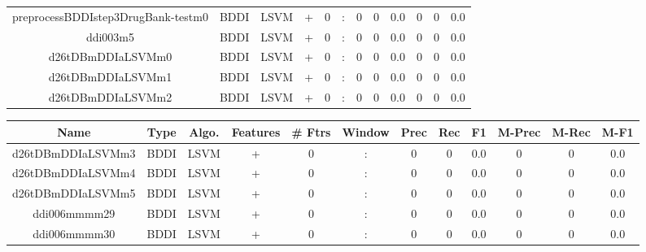 \documentclass[a4paper]{article}
\begin{document}
\begin{landscape}
\begin{center}
\begin{tabular}{ |c|c|c|c|c|c|c|c|c|c|c|c|}
 
 	
 	\small{ preprocessBDDIstep3DrugBank-testm0 } & BDDI & LSVM & +  &  0 &  :  &  0 & 0 & 0.0  &  0 & 0 & 0.0 \\
 	

 
 	
 	\small{ ddi003m5 } & BDDI & LSVM & +  &  0 &  :  &  0 & 0 & 0.0  &  0 & 0 & 0.0 \\
 	

 
 	
 	\small{ d26tDBmDDIaLSVMm0 } & BDDI & LSVM & +  &  0 &  :  &  0 & 0 & 0.0  &  0 & 0 & 0.0 \\
 	

 
 	
 	\small{ d26tDBmDDIaLSVMm1 } & BDDI & LSVM & +  &  0 &  :  &  0 & 0 & 0.0  &  0 & 0 & 0.0 \\
 	

 
 	
 	\small{ d26tDBmDDIaLSVMm2 } & BDDI & LSVM & +  &  0 &  :  &  0 & 0 & 0.0  &  0 & 0 & 0.0 \\
 	
 \hline
\end{tabular}
\end{center}




\begin{center}
\begin{tabular}{ |c|c|c|c|c|c|c|c|c|c|c|c|} 
 \hline
 	Name & Type & Algo. & Features & \# Ftrs & Window & Prec & Rec & F1 & M-Prec & M-Rec & M-F1\\
 \hline

 	

 
 	
 	\small{ d26tDBmDDIaLSVMm3 } & BDDI & LSVM & +  &  0 &  :  &  0 & 0 & 0.0  &  0 & 0 & 0.0 \\
 	

 
 	
 	\small{ d26tDBmDDIaLSVMm4 } & BDDI & LSVM & +  &  0 &  :  &  0 & 0 & 0.0  &  0 & 0 & 0.0 \\
 	

 
 	
 	\small{ d26tDBmDDIaLSVMm5 } & BDDI & LSVM & +  &  0 &  :  &  0 & 0 & 0.0  &  0 & 0 & 0.0 \\
 	

 
 	
 	\small{ ddi006mmmm29 } & BDDI & LSVM & +  &  0 &  :  &  0 & 0 & 0.0  &  0 & 0 & 0.0 \\
 	

 
 	
 	\small{ ddi006mmmm30 } & BDDI & LSVM & +  &  0 &  :  &  0 & 0 & 0.0  &  0 & 0 & 0.0 \\
 	


\end{tabular}
\end{center}
\end{landscape}
\end{document}
